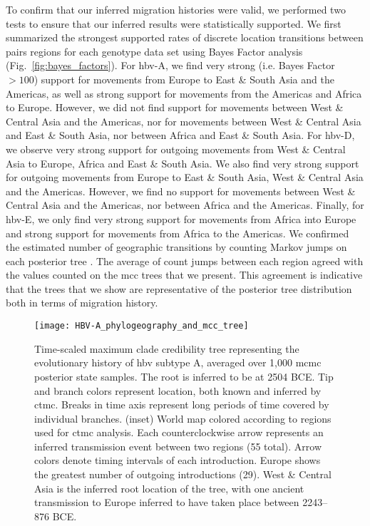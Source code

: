 To confirm that our inferred migration histories were valid, we performed two tests to ensure that our inferred results were statistically supported.
We first summarized the strongest supported rates of discrete location transitions between pairs regions for each genotype data set using Bayes Factor analysis (Fig.~\ref{fig:bayes_factors}).
For \gls{hbv}-A, we find very strong (i.e. Bayes Factor $>100$) support for movements from Europe to East \& South Asia and the Americas, as well as strong support for movements from the Americas and Africa to Europe.
However, we did not find support for movements between West \& Central Asia and the Americas, nor for movements between West \& Central Asia and East \& South Asia, nor between Africa and East \& South Asia.
For \gls{hbv}-D, we observe very strong support for outgoing movements from West \& Central Asia to Europe, Africa and East \& South Asia.
We also find very strong support for outgoing movements from Europe to East \& South Asia, West \& Central Asia and the Americas.
However, we find no support for movements between West \& Central Asia and the Americas, nor between Africa and the Americas.
Finally, for \gls{hbv}-E, we only find very strong support for movements from Africa into Europe and strong support for movements from Africa to the Americas.
We confirmed the estimated number of geographic transitions by counting Markov jumps on each posterior tree .
The average of count jumps between each region agreed with the values counted on the \gls{mcc} trees that we present.
This agreement is indicative that the trees that we show are representative of the posterior tree distribution both in terms of migration history.

\barneycomment{\ref{fig:bayes_factors}}

\begin{figure}[ht]
  \centering
  \medskip
  \texttt{[image: HBV-A\_phylogeography\_and\_mcc\_tree]}
  \caption[HBV-A phylogeography ]{Time-scaled maximum clade credibility tree representing the evolutionary history of \gls{hbv} subtype A, averaged over 1,000 \gls{mcmc} posterior state samples. The root is inferred to be at 2504 BCE. Tip and branch colors represent location, both known and inferred by \gls{ctmc}. Breaks in time axis represent long periods of time covered by individual branches. (inset) World map colored according to regions used for \gls{ctmc} analysis. Each counterclockwise arrow represents an inferred transmission event between two regions (55 total). Arrow colors denote timing intervals of each introduction. Europe shows the greatest number of outgoing introductions (29). West \& Central Asia is the inferred root location of the tree, with one ancient transmission to Europe inferred to have taken place between 2243--876 BCE.}
  \label{fig:HBV-A_phylogeo}
\end{figure}

